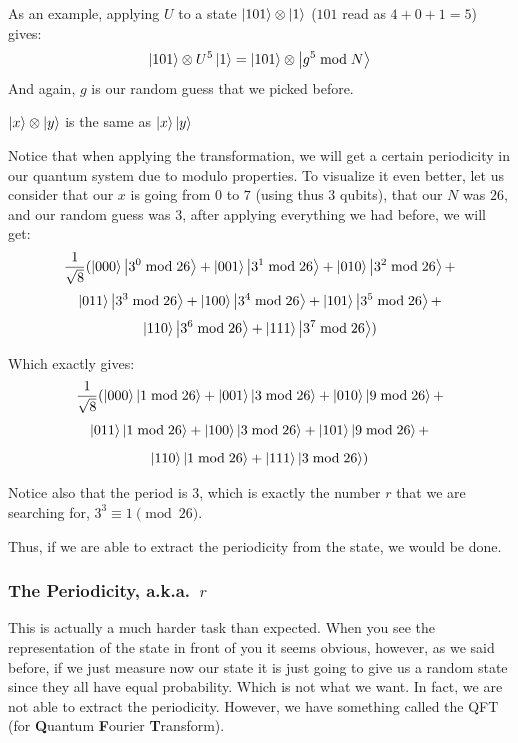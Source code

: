 As an example, applying $U$ to a state $\ket{101} \otimes \ket{1}$
($101$ read as $4 + 0 + 1 = 5$) gives:
$$
\ket{101} \otimes U^5 \ket{1} = \ket{101} \otimes \ket{g^5 \bmod N}
$$
And again, $g$ is our random guess that we picked before.

\begin{smjnote}
$\ket{x}\otimes\ket{y}$ is the same as $\ket{x}\ket{y}$
\end{smjnote}

Notice that when applying the transformation, we will get a certain periodicity
in our quantum system due to modulo properties. To visualize it even better,
let us consider that our $x$ is going from $0$ to $7$ (using thus $3$ qubits),
that our $N$ was $26$, and our random guess was $3$, after applying everything
we had before, we will get:
$$
\frac{1}{\sqrt{8}} (\ket{000} \ket{3^0 \bmod 26} + \ket{001} \ket{3^1 \bmod 26}
+ \ket{010} \ket{3^2 \bmod 26} +
$$
$$
\ket{011} \ket{3^3 \bmod 26} + \ket{100} \ket{3^4 \bmod 26}
+ \ket{101} \ket{3^5 \bmod 26} +
$$
$$
\ket{110} \ket{3^6 \bmod 26} + \ket{111} \ket{3^7 \bmod 26})
$$

Which exactly gives:
$$
\frac{1}{\sqrt{8}} (\ket{000} \ket{1 \bmod 26} + \ket{001} \ket{3 \bmod 26}
+ \ket{010} \ket{9 \bmod 26} +
$$
$$
\ket{011} \ket{1 \bmod 26} + \ket{100} \ket{3 \bmod 26}
+ \ket{101} \ket{9 \bmod 26} +
$$
$$
\ket{110} \ket{1 \bmod 26} + \ket{111} \ket{3 \bmod 26})
$$

Notice also that the period is $3$, which is exactly the number $r$ that we
are searching for, $3^3 \equiv 1 \pmod{26}$.

Thus, if we are able to extract the periodicity from the state, we would be
done.

\subsubsection{The Periodicity, a.k.a.\ $r$}

This is actually a much harder task than expected. When you see the
representation of the state in front of you it seems obvious, however, as we
said before, if we just measure now our state it is just going to give us a
random state since they all have equal probability. Which is not what we want.
In fact, we are not able to extract the periodicity. However, we have something
called the QFT (for \textbf{Q}uantum \textbf{F}ourier \textbf{T}ransform).

